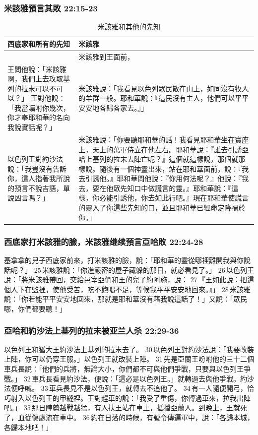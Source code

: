 \subsubsection{米該雅預言其敗 22:15-23}
\begin{table}[H]
\hspace*{-10mm}
\centering 
{}
\begin{tabular}{p{6.75cm}|p{11.25cm}}\hline\hline
西底家和所有的先知&米該雅\\\hline
&米該雅到王面前，\\\hline
王問他說：「米該雅啊，我們上去攻取基列的拉末可以不可以？」
王對他說：「我當囑咐你幾次，你才奉耶和華的名向我說實話呢？」&米該雅說：「我看見以色列眾民散在山上，如同沒有牧人的羊群一般。耶和華說：『這民沒有主人，他們可以平平安安地各歸各家去。』」\\\hline
以色列王對約沙法說：「我豈沒有告訴你，這人指著我所說的預言不說吉語，單說凶言嗎？」&米該雅說：「你要聽耶和華的話！我看見耶和華坐在寶座上，天上的萬軍侍立在他左右。耶和華說：『誰去引誘亞哈上基列的拉末去陣亡呢？』這個就這樣說，那個就那樣說。隨後有一個神靈出來，站在耶和華面前，說：『我去引誘他。』耶和華問他說：『你用何法呢？』他說：『我去，要在他眾先知口中做謊言的靈。』耶和華說：『這樣，你必能引誘他，你去如此行吧。』現在耶和華使謊言的靈入了你這些先知的口，並且耶和華已經命定降禍於你。」\\\hline
\end{tabular}
\caption{米該雅和其他的先知}
\end{table} 


\subsubsection{西底家打米該雅的臉，米該雅继续預言亞哈敗  22:24-28}
基拿拿的兒子西底家前來，打米該雅的臉，說：「耶和華的靈從哪裡離開我與你說話呢？」 25 米該雅說：「你進嚴密的屋子藏躲的那日，就必看見了。」 26 以色列王說：「將米該雅帶回，交給邑宰亞們和王的兒子約阿施，說： 27 『王如此說：把這個人下在監裡，使他受苦，吃不飽喝不足，等候我平平安安地回來。』」 28 米該雅說：「你若能平平安安地回來，那就是耶和華沒有藉我說這話了！」又說：「眾民哪，你們都要聽！」


\subsubsection{亞哈和約沙法上基列的拉末被亚兰人杀  22:29-36}
以色列王和猶大王約沙法上基列的拉末去了。 30 以色列王對約沙法說：「我要改裝上陣，你可以仍穿王服。」以色列王就改裝上陣。 31 先是亞蘭王吩咐他的三十二個車兵長說：「他們的兵將，無論大小，你們都不可與他們爭戰，只要與以色列王爭戰。」 32 車兵長看見約沙法，便說：「這必是以色列王。」就轉過去與他爭戰。約沙法便呼喊。 33 車兵長見不是以色列王，就轉去不追他了。 34 有一人隨便開弓，恰巧射入以色列王的甲縫裡。王對趕車的說：「我受了重傷，你轉過車來，拉我出陣吧。」 35 那日陣勢越戰越猛，有人扶王站在車上，抵擋亞蘭人。到晚上，王就死了，血從傷處流在車中。 36 約在日落的時候，有號令傳遍軍中，說：「各歸本城，各歸本地吧！」

